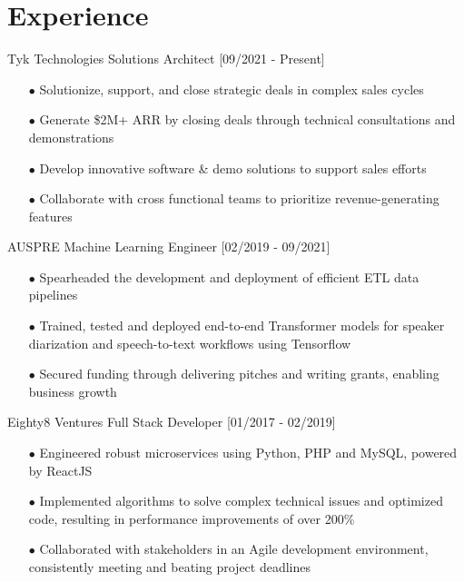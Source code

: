 \documentclass[]{twentysecondcv}
\begin{document}


\section{Experience}
\vspace{-10px}

\begin{twenty}
  \twentyitem
    {Tyk Technologies}
    {Solutions Architect}
    {[09/2021 - Present]}
    {
    \begin{itemize}
        \item[$\bullet$] Solutionize, support, and close strategic deals in complex sales cycles 
        \item[$\bullet$] Generate \$2M+ ARR by closing deals through technical consultations and demonstrations 
        \item[$\bullet$] Develop innovative software \& demo solutions to support sales efforts 
        \item[$\bullet$] Collaborate with cross functional teams to prioritize revenue-generating features
    \end{itemize}
    }
  \twentyitem
    {AUSPRE}
    {Machine Learning Engineer}
    {[02/2019 - 09/2021]}
    {
    \begin{itemize}
        \item[$\bullet$] Spearheaded the development and deployment of efficient ETL data pipelines
        \item[$\bullet$] Trained, tested and deployed end-to-end Transformer models for speaker diarization and speech-to-text workflows using Tensorflow
        \item[$\bullet$] Secured funding through delivering pitches and writing grants, enabling business growth
    \end{itemize}
    }
\twentyitem
    {Eighty8 Ventures}
    {Full Stack Developer}
    {[01/2017 - 02/2019]}
    {
    \begin{itemize}
        \item[$\bullet$] Engineered robust microservices using Python, PHP and MySQL, powered by ReactJS
        \item[$\bullet$] Implemented algorithms to solve complex technical issues and optimized code, resulting in performance improvements of over 200\%
        \item[$\bullet$] Collaborated with stakeholders in an Agile development environment, consistently meeting and beating project deadlines
    \end{itemize}
    }


\end{twenty}
\end{document}
